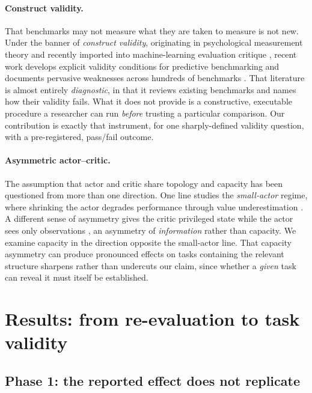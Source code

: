 \documentclass{article}
\begin{document}
\paragraph{Construct validity.} That benchmarks may not measure what they are taken to
measure is not new. Under the banner of \emph{construct validity}, originating in
psychological measurement theory \citep{cronbach1955construct} and recently imported into
machine-learning evaluation critique \citep{raji2021everything}, recent work develops explicit
validity conditions for predictive benchmarking \citep{freiesleben2025benchmarking} and
documents pervasive weaknesses across hundreds of benchmarks \citep{bean2025measuring}. That
literature is almost entirely \emph{diagnostic}, in that it reviews existing benchmarks and
names how their validity fails. What it does not provide is a constructive, executable
procedure a researcher can run \emph{before} trusting a particular comparison. Our
contribution is exactly that instrument, for one sharply-defined validity question, with a
pre-registered, pass/fail outcome.

\paragraph{Asymmetric actor--critic.} The assumption that actor and critic share topology and
capacity has been questioned from more than one direction. One line studies the
\emph{small-actor} regime, where shrinking the actor degrades performance through value
underestimation \citep{mastikhina2025optimistic}. A different sense of asymmetry gives the
critic privileged state while the actor sees only observations \citep{pinto2018asymmetric},
an asymmetry of \emph{information} rather than capacity. We examine capacity in the direction
opposite the small-actor line. That capacity asymmetry can produce pronounced effects on
tasks containing the relevant structure sharpens rather than undercuts our claim, since
whether a \emph{given} task can reveal it must itself be established.

\section{Results: from re-evaluation to task validity}
\label{sec:results}

\subsection{Phase 1: the reported effect does not replicate}
\label{sec:phase1}
\end{document}
